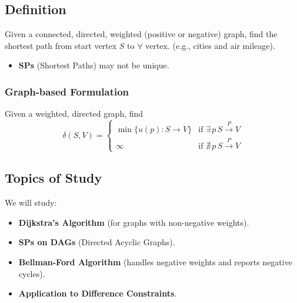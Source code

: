 \subsection{Definition}
\begin{definition}
    Given a connected, directed, weighted (positive or negative) graph, find the shortest path from start vertex \( S \) to \(\forall\) vertex. (e.g., cities and air mileage).

    \begin{itemize}
        \item \textbf{SPs} (Shortest Paths) may not be unique.
    \end{itemize}

\end{definition}

\subsubsection{Graph-based Formulation}
\begin{definition}
    Given a weighted, directed graph, find
    \[
    \delta(S, V) = \begin{cases} 
        \min \{ u(p) : S \rightarrow V \} & \text{if } \exists \, p \, S \overset{P}{\rightarrow} V \\
        \infty & \text{if } \nexists \, p \, S \overset{P}{\rightarrow} V 
    \end{cases}
    \]
\end{definition}

\subsection{Topics of Study}
\begin{definition}
    We will study:
    \begin{itemize}
        \item \textbf{Dijkstra's Algorithm} (for graphs with non-negative weights).
        \item \textbf{SPs on DAGs} (Directed Acyclic Graphs).
        \item \textbf{Bellman-Ford Algorithm} (handles negative weights and reports negative cycles).
        \item \textbf{Application to Difference Constraints}.
    \end{itemize}
\end{definition}


